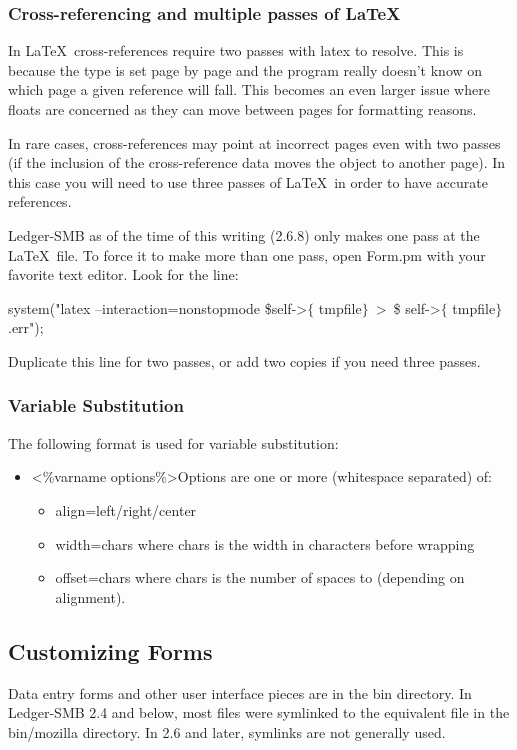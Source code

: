 \documentclass{article}
\begin{document}
\subsubsection{Cross-referencing and multiple passes of \LaTeX}
In \LaTeX\ cross-references require two passes with latex to resolve. This is
because the type is set page by page and the program really doesn't know on
which page a given reference will fall. This becomes an even larger issue where
floats are concerned as they can move between pages for formatting reasons.

In rare cases, cross-references may point at incorrect pages even with two
passes (if the inclusion of the cross-reference data moves the object to another
page). In this case you will need to use three passes of \LaTeX\ in order to 
have accurate references.

Ledger-SMB as of the time of this writing (2.6.8) only makes one pass at the
\LaTeX\ file. To force it to make more than one pass, open Form.pm with your
favorite text editor. Look for the line:

system("latex  --interaction=nonstopmode 
\$self-\textgreater$\lbrace$ tmpfile$\rbrace$\
\textgreater\ \$ self-\textgreater$\lbrace$ tmpfile$\rbrace$ .err");

Duplicate this line for two passes, or add two copies if you need three passes. 

\subsubsection{Variable Substitution}
The following format is used for variable substitution:
\begin{itemize}
\item \textless\%varname options\%\textgreater Options are one or more 
	(whitespace separated) of:
  \begin{itemize}
  \item align=left/right/center
  \item width=chars where chars is the width in characters before wrapping
  \item offset=chars where chars is the number of spaces to (depending on
alignment). 
  \end{itemize}

\end{itemize}

\subsection{Customizing Forms}
Data entry forms and other user interface pieces are in the bin directory.  In
Ledger-SMB 2.4 and below, most files were symlinked to the equivalent file in
the bin/mozilla directory.  In 2.6 and later, symlinks are not generally used.
\end{document}
